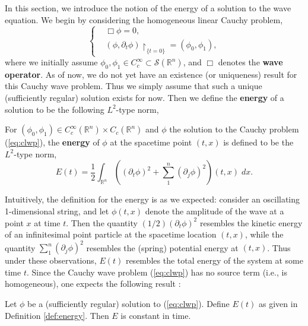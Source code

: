 \documentclass{article}
\begin{document}
In this section, we introduce the notion of the energy of a solution to the wave equation. We begin by considering the homogeneous linear Cauchy problem, 
\begin{equation}
	\left\{
	\begin{alignedat}{1}
		&\Box \phi = 0, \\
		&(\phi, \partial_{t}\phi)\upharpoonright_{\{t = 0\}} = (\phi_{0}, \phi_{1}), 
	\end{alignedat}
	\right.
	\label{eq:clwp}
\end{equation}
where we initially assume $\phi_{0}, \phi_{1} \in C_{c}^{\infty} \subset \mathcal{S}(\mathbb{R}^{n})$, and $\Box$ denotes the \textbf{wave operator}. As of now, we do not yet have an existence (or uniqueness) result for this Cauchy wave problem. Thus we simply assume that such a unique (sufficiently regular) solution exists for now. Then we define the \textbf{energy} of a solution to be the following $L^{2}$-type norm,
\begin{definition}[Energy]
	For $(\phi_{0}, \phi_{1}) \in C_{c}^{\infty}(\mathbb{R}^{n}) \times C_{c}(\mathbb{R}^{n})$ and $\phi$ the solution to the Cauchy problem (\ref{eq:clwp}), the \textbf{energy} of $\phi$ at the spacetime point $(t, x)$ is defined to be the $L^{2}$-type norm, 
	\begin{equation}
		E(t) = \frac{1}{2}\int_{\mathbb{R}^{n}}\left((\partial_{t}\phi)^{2} + \sum_{1}^{n}(\partial_{j}\phi)^{2}\right)(t, x)\;dx. 
		\label{eq:energy_lwp}
	\end{equation}
	\label{def:energy}
\end{definition}
Intuitively, the definition for the energy is as we expected: consider an oscillating 1-dimensional string, and let $\phi(t, x)$ denote the amplitude of the wave at a point $x$ at time $t$. Then the quantity $(1/2)(\partial_{t}\phi)^{2}$ resembles the kinetic energy of an infinitesimal point particle at the spacetime location $(t, x)$, while the quantity $\sum_{1}^{n}(\partial_{j}\phi)^{2}$ resembles the (spring) potential energy at $(t, x)$. Thus under these observations, $E(t)$ resembles the total energy of the system at some time $t$. Since the Cauchy wave problem (\ref{eq:clwp}) has no source term (i.e., is homogeneous), one expects the following result \cite{Luk}: 
\begin{prop}
	Let $\phi$ be a (sufficiently regular) solution to (\ref{eq:clwp}). Define $E(t)$ as given in Definition \ref{def:energy}. Then $E$ is constant in time. 
	\label{prop:cons_energy}
\end{prop} 
\end{document}
